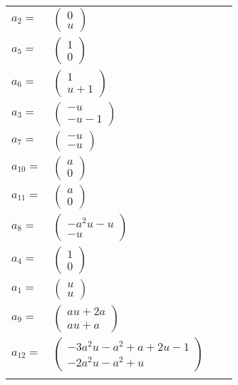 \documentclass[1p]{elsarticle_modified}
\theoremstyle{definition}
\begin{document}
\begin{tabular}{m{7pt} m{180pt} m{7pt} m{180pt} }
\flushright $a_{2}=$&$\begin{pmatrix}0\\u\end{pmatrix}$ \\
\flushright $a_{5}=$&$\begin{pmatrix}1\\0\end{pmatrix}$ \\
\flushright $a_{6}=$&$\begin{pmatrix}1\\u+1\end{pmatrix}$ \\
\flushright $a_{3}=$&$\begin{pmatrix}- u\\- u-1\end{pmatrix}$ \\
\flushright $a_{7}=$&$\begin{pmatrix}- u\\- u\end{pmatrix}$ \\
\flushright $a_{10}=$&$\begin{pmatrix}a\\0\end{pmatrix}$ \\
\flushright $a_{11}=$&$\begin{pmatrix}a\\0\end{pmatrix}$ \\
\flushright $a_{8}=$&$\begin{pmatrix}- a^2 u- u\\- u\end{pmatrix}$ \\
\flushright $a_{4}=$&$\begin{pmatrix}1\\0\end{pmatrix}$ \\
\flushright $a_{1}=$&$\begin{pmatrix}u\\u\end{pmatrix}$ \\
\flushright $a_{9}=$&$\begin{pmatrix}a u+2 a\\a u+a\end{pmatrix}$ \\
\flushright $a_{12}=$&$\begin{pmatrix}-3 a^2 u- a^2+a+2 u-1\\-2 a^2 u- a^2+u\end{pmatrix}$\\&\end{tabular}
\end{document}
